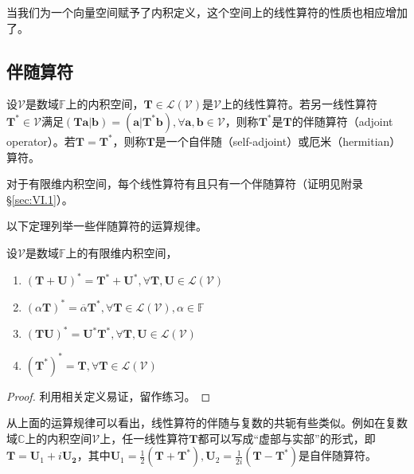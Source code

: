 \documentclass[main.tex]{subfiles}
\begin{document}
当我们为一个向量空间赋予了内积定义，这个空间上的线性算符的性质也相应增加了。

\subsection{伴随算符}
\begin{definition}[伴随算符]\label{def:II.6.1}
设$\mathcal{V}$是数域$\mathbb{F}$上的内积空间，$\mathbf{T}\in\mathcal{L}\left(\mathcal{V}\right)$是$\mathcal{V}$上的线性算符。若另一线性算符$\mathbf{T}^*\in\mathcal{V}$满足$\left(\mathbf{Ta}|\mathbf{b}\right)=\left(\mathbf{a}|\mathbf{T}^*\mathbf{b}\right),\forall\mathbf{a},\mathbf{b}\in\mathcal{V}$，则称$\mathbf{T}^*$是$\mathbf{T}$的伴随算符（adjoint operator）。若$\mathbf{T}=\mathbf{T}^*$，则称$\mathbf{T}$是一个自伴随（self-adjoint）或厄米（hermitian）算符。
\end{definition}

对于有限维内积空间，每个线性算符有且只有一个伴随算符（证明见附录\S\ref{sec:VI.1}）。

以下定理列举一些伴随算符的运算规律。

\begin{theorem}\label{thm:II.6.1}
设$\mathcal{V}$是数域$\mathbb{F}$上的有限维内积空间，
\begin{enumerate}
    \item $\left(\mathbf{T}+\mathbf{U}\right)^*=\mathbf{T}^*+\mathbf{U}^*,\forall\mathbf{T},\mathbf{U}\in\mathcal{L}\left(\mathcal{V}\right)$
    \item $\left(\alpha\mathbf{T}\right)^*=\overline{\alpha}\mathbf{T}^*,\forall\mathbf{T}\in\mathcal{L}\left(\mathcal{V}\right),\alpha\in\mathbb{F}$
    \item $\left(\mathbf{TU}\right)^*=\mathbf{U}^*\mathbf{T}^*,\forall\mathbf{T},\mathbf{U}\in\mathcal{L}\left(\mathcal{V}\right)$
    \item $\left(\mathbf{T}^*\right)^*=\mathbf{T},\forall\mathbf{T}\in\mathcal{L}\left(\mathcal{V}\right)$
\end{enumerate}
\end{theorem}
\begin{proof}
利用相关定义易证，留作练习。
\end{proof}

从上面的运算规律可以看出，线性算符的伴随与复数的共轭有些类似。例如在复数域$\mathbb{C}$上的内积空间$\mathcal{V}$上，任一线性算符$\mathbf{T}$都可以写成“虚部与实部”的形式，即$\mathbf{T}=\mathbf{U}_1+i\mathbf{U_2}$，其中$\mathbf{U}_1=\frac{1}{2}\left(\mathbf{T}+\mathbf{T}^*\right),\mathbf{U}_2=\frac{1}{2i}\left(\mathbf{T}-\mathbf{T}^*\right)$是自伴随算符。
\end{document}
